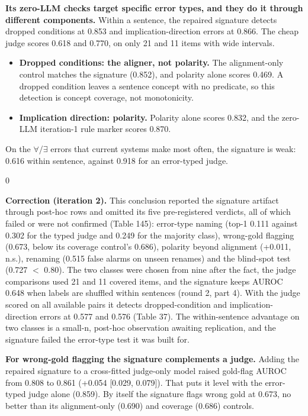 \documentclass[11pt,letterpaper]{article}
\newenvironment{correction}{\par\medskip\noindent\begin{minipage}{\linewidth}\setlength{\fboxsep}{6pt}\begin{lrbox}{0}\begin{minipage}{0.96\linewidth}\small}{\end{minipage}\end{lrbox}\colorbox{black!6}{\usebox{0}}\end{minipage}\par\medskip}
\begin{document}
\textbf{Its zero-LLM checks target specific error types, and they do it through different components.} Within a sentence, the repaired signature detects dropped conditions at 0.853 and implication-direction errors at 0.866. The cheap judge scores 0.618 and 0.770, on only 21 and 11 items with wide intervals.

\begin{itemize}
\item {}\textbf{Dropped conditions: the aligner, not polarity.} The alignment-only control matches the signature (0.852), and polarity alone scores 0.469. A dropped condition leaves a sentence concept with no predicate, so this detection is concept coverage, not monotonicity.
\item {}\textbf{Implication direction: polarity.} Polarity alone scores 0.832, and the zero-LLM iteration-1 rule marker scores 0.870.
\end{itemize}
On the $\forall$/$\exists$ errors that current systems make most often, the signature is weak: 0.616 within sentence, against 0.918 for an error-typed judge.

\begin{correction}\textbf{Correction (iteration 2).} This conclusion reported the signature artifact through post-hoc rows and omitted its five pre-registered verdicts, all of which failed or were not confirmed (Table 145): error-type naming (top-1 0.111 against 0.302 for the typed judge and 0.249 for the majority class), wrong-gold flagging (0.673, below its coverage control's 0.686), polarity beyond alignment (+0.011, n.s.), renaming (0.515 false alarms on unseen renames) and the blind-spot test (0.727 $<$ 0.80). The two classes were chosen from nine after the fact, the judge comparisons used 21 and 11 covered items, and the signature keeps AUROC 0.648 when labels are shuffled within sentences (round 2, part 4). With the judge scored on all available pairs it detects dropped-condition and implication-direction errors at 0.577 and 0.576 (Table 37). The within-sentence advantage on two classes is a small-n, post-hoc observation awaiting replication, and the signature failed the error-type test it was built for.\end{correction}

\textbf{For wrong-gold flagging the signature complements a judge.} Adding the repaired signature to a cross-fitted judge-only model raised gold-flag AUROC from 0.808 to 0.861 (+0.054 [0.029, 0.079]). That puts it level with the error-typed judge alone (0.859). By itself the signature flags wrong gold at 0.673, no better than its alignment-only (0.690) and coverage (0.686) controls.
\end{document}
